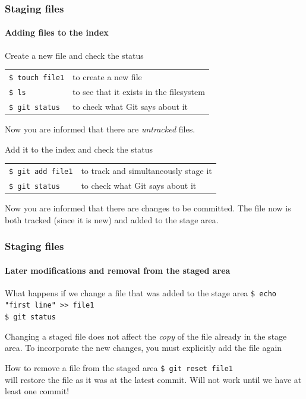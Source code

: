 \begin{frame}
\frametitle{Staging files}
\framesubtitle{Adding files to the index}

\begin{block}{Create a new file and check the status}
\begin{tabular}{ll}
\texttt{\$ touch file1} & to create a new file \\
\texttt{\$ ls} & to see that it exists in the filesystem \\
\texttt{\$ git status} & to check what Git says about it
\end{tabular}

\medskip
Now you are informed that there are {\em untracked} files.
\end{block}

\pause

\begin{block}{Add it to the index and check the status}
\begin{tabular}{ll}
\texttt{\$ git add file1} & to track and simultaneously stage it \\
\texttt{\$ git status} & to check what Git says about it
\end{tabular}

\medskip
Now you are informed that there are changes to be committed. The file now is both tracked (since it is new) and added to the stage area.
\end{block}

\end{frame}

\begin{frame}
\frametitle{Staging files}
\framesubtitle{Later modifications and removal from the staged area}

\begin{block}{What happens if we change a file that was added to the stage area}
\texttt{\$ echo "first line" >\;\!\!> file1} \\
\texttt{\$ git status} 

\medskip
Changing a staged file does not affect the {\em copy} of the file already in the stage area.
To incorporate the new changes, you must explicitly add the file again
\end{block}

\pause
\begin{block}{How to remove a file from the staged area}
\texttt{\$ git reset file1} \\
will restore the file as it was at the latest commit. Will not work until we have at least one commit!
\end{block}

\end{frame}

